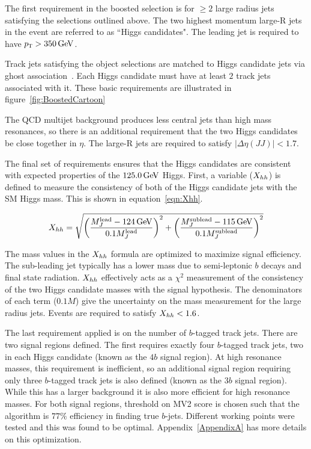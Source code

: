 The first requirement in the boosted selection is for $\geq 2$ large radius jets satisfying the selections outlined above. The two highest momentum large-R jets in the event are referred to as ``Higgs candidates". The leading jet is required to have $\pT > 350 \GeV$. 

Track jets satisfying the object selections are matched to Higgs candidate jets via ghost association~\cite{GhostAssociation}. Each Higgs candidate must have at least $2$ track jets associated with it. These basic requirements are illustrated in figure~\ref{fig:BoostedCartoon}

The QCD multijet background produces less central jets than high mass resonances, so there is an additional requirement that the two Higgs candidates be close together in $\eta$. The large-R jets are required to satisfy $|\Delta\eta(JJ)| < 1.7$. 

The final set of requirements ensures that the Higgs candidates are consistent with expected properties of the $125.0 \GeV$ Higgs. First, a variable ($X_{hh}$) is defined to measure the consistency of both of the Higgs candidate jets with the SM Higgs mass. This is shown in equation~\ref{eqn:Xhh}. 

\begin{equation}
\label{eqn:Xhh}
\Xhh = \sqrt{\left(\frac{M_J^{\rm lead} - 124 \GeV}{0.1 M_J^{\rm lead}}\right)^2 + \left(\frac{M_J^{\rm sublead} - 115 \GeV}{0.1 M_J^{\rm sublead}}\right)^2}
\end{equation}

The mass values in the $X_{hh}$ formula are optimized to maximize signal efficiency. The sub-leading jet typically has a lower mass due to semi-leptonic $b$ decays and final state radiation. $X_{hh}$ effectively acts as a $\chi^2$ measurement of the consistency of the two Higgs candidate masses with the signal hypothesis. The denominators of each term ($0.1M$) give the uncertainty on the mass measurement for the large radius jets. Events are required to satisfy $X_{hh} < 1.6$. 

The last requirement applied is on the number of $b$-tagged track jets. There are two signal regions defined. The first requires exactly four $b$-tagged track jets, two in each Higgs candidate (known as the $4b$ signal region). At high resonance masses, this requirement is inefficient, so an additional signal region requiring only three $b$-tagged track jets is also defined (known as the $3b$ signal region). While this has a larger background it is also more efficient for high resonance masses. For both signal regions, threshold on MV2 score is chosen such that the algorithm is $77\%$ efficiency in finding true $b$-jets. Different working points were tested and this was found to be optimal. Appendix~\ref{AppendixA} has more details on this optimization. 

